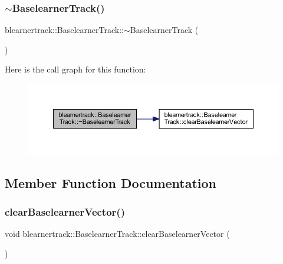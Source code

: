 \subsubsection{\texorpdfstring{$\sim$\+Baselearner\+Track()}{~BaselearnerTrack()}}
{\footnotesize\ttfamily blearnertrack\+::\+Baselearner\+Track\+::$\sim$\+Baselearner\+Track (\begin{DoxyParamCaption}{ }\end{DoxyParamCaption})}

Here is the call graph for this function\+:\nopagebreak
\begin{figure}[H]
\begin{center}
\leavevmode
\includegraphics[width=350pt]{classblearnertrack_1_1_baselearner_track_a93e9a1268d46808b9d6fe768fa11e22a_cgraph}
\end{center}
\end{figure}


\subsection{Member Function Documentation}
\mbox{\label{classblearnertrack_1_1_baselearner_track_aa178f9d817a01240b6f39075f1f445f2}} 
\subsubsection{\texorpdfstring{clear\+Baselearner\+Vector()}{clearBaselearnerVector()}}
{\footnotesize\ttfamily void blearnertrack\+::\+Baselearner\+Track\+::clear\+Baselearner\+Vector (\begin{DoxyParamCaption}{ }\end{DoxyParamCaption})}

